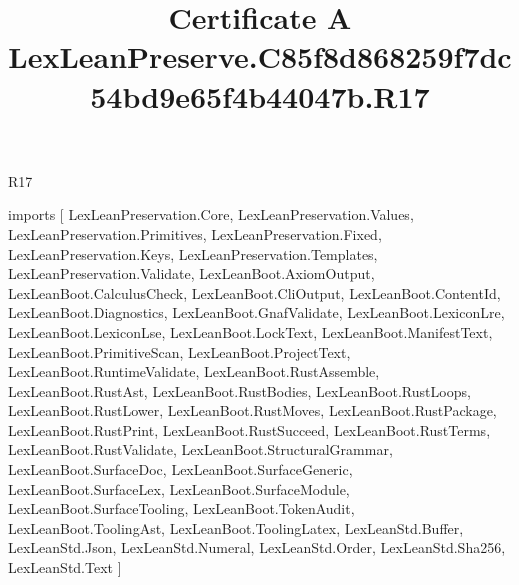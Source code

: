 \begin{lexlean}{R17}
\title{Certificate A LexLeanPreserve.C85f8d868259f7dc54bd9e65f4b44047b.R17}
\begin{coremodule}
imports [
  LexLeanPreservation.Core,
  LexLeanPreservation.Values,
  LexLeanPreservation.Primitives,
  LexLeanPreservation.Fixed,
  LexLeanPreservation.Keys,
  LexLeanPreservation.Templates,
  LexLeanPreservation.Validate,
  LexLeanBoot.AxiomOutput,
  LexLeanBoot.CalculusCheck,
  LexLeanBoot.CliOutput,
  LexLeanBoot.ContentId,
  LexLeanBoot.Diagnostics,
  LexLeanBoot.GnafValidate,
  LexLeanBoot.LexiconLre,
  LexLeanBoot.LexiconLse,
  LexLeanBoot.LockText,
  LexLeanBoot.ManifestText,
  LexLeanBoot.PrimitiveScan,
  LexLeanBoot.ProjectText,
  LexLeanBoot.RuntimeValidate,
  LexLeanBoot.RustAssemble,
  LexLeanBoot.RustAst,
  LexLeanBoot.RustBodies,
  LexLeanBoot.RustLoops,
  LexLeanBoot.RustLower,
  LexLeanBoot.RustMoves,
  LexLeanBoot.RustPackage,
  LexLeanBoot.RustPrint,
  LexLeanBoot.RustSucceed,
  LexLeanBoot.RustTerms,
  LexLeanBoot.RustValidate,
  LexLeanBoot.StructuralGrammar,
  LexLeanBoot.SurfaceDoc,
  LexLeanBoot.SurfaceGeneric,
  LexLeanBoot.SurfaceLex,
  LexLeanBoot.SurfaceModule,
  LexLeanBoot.SurfaceTooling,
  LexLeanBoot.TokenAudit,
  LexLeanBoot.ToolingAst,
  LexLeanBoot.ToolingLatex,
  LexLeanStd.Buffer,
  LexLeanStd.Json,
  LexLeanStd.Numeral,
  LexLeanStd.Order,
  LexLeanStd.Sha256,
  LexLeanStd.Text
]


\end{coremodule}
\end{lexlean}
